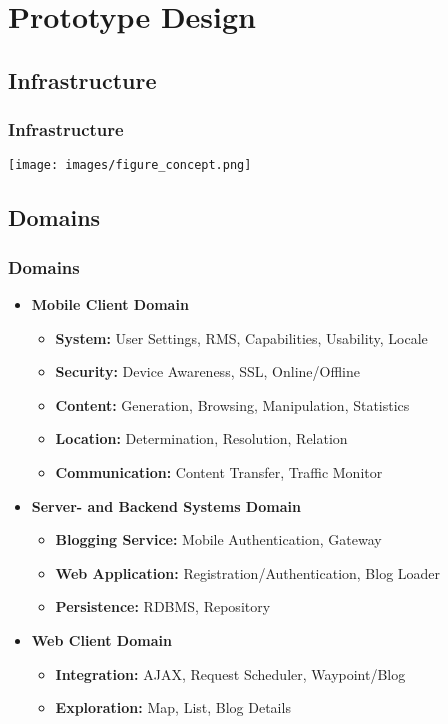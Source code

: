 \documentclass[blue]{beamer}
\begin{document}
\section{Prototype Design}

\subsection{Infrastructure}
\frame
{
\frametitle{\textbf{Infrastructure}}
\texttt{[image: images/figure\_concept.png]}
}

\subsection{Domains}
\frame
{
\frametitle{\textbf{Domains}}
\begin{itemize}
\item \color[rgb]{0.2,0.3,0.8} \textbf{Mobile Client Domain}
  \begin{itemize}
    \item \textbf{System:} User Settings, RMS, Capabilities, Usability, Locale
    \item \textbf{Security:} Device Awareness, SSL, Online/Offline
    \item \textbf{Content:} Generation, Browsing, Manipulation, Statistics
    \item \textbf{Location:} Determination, Resolution, Relation
    \item \textbf{Communication:} Content Transfer, Traffic Monitor 
  \end{itemize}
\item \textbf{Server- and Backend Systems Domain}
  \begin{itemize}
    \item \textbf{Blogging Service:} Mobile Authentication, Gateway 
    \item \textbf{Web Application:} Registration/Authentication, Blog Loader
    \item \textbf{Persistence:} RDBMS, Repository
  \end{itemize}
\item \textbf{Web Client Domain}
  \begin{itemize}
    \item \textbf{Integration:} AJAX, Request Scheduler, Waypoint/Blog
    \item \textbf{Exploration:} Map, List, Blog Details
  \end{itemize}
\end{itemize}
}
\end{document}
